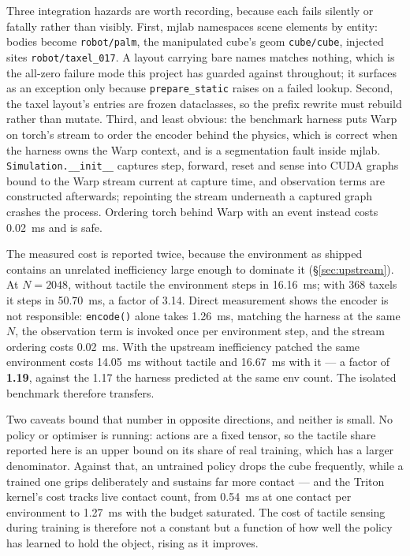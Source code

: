 \documentclass[journal]{IEEEtran}
\begin{document}
Three integration hazards are worth recording, because each fails silently or fatally rather than visibly. First, mjlab namespaces scene elements by entity: bodies become \texttt{robot/palm}, the manipulated cube's geom \texttt{cube/cube}, injected sites \texttt{robot/taxel\_017}. A layout carrying bare names matches nothing, which is the all-zero failure mode this project has guarded against throughout; it surfaces as an exception only because \texttt{prepare\_static} raises on a failed lookup. Second, the taxel layout's entries are frozen dataclasses, so the prefix rewrite must rebuild rather than mutate. Third, and least obvious: the benchmark harness puts Warp on torch's stream to order the encoder behind the physics, which is correct when the harness owns the Warp context, and is a segmentation fault inside mjlab. \texttt{Simulation.\_\_init\_\_} captures step, forward, reset and sense into CUDA graphs bound to the Warp stream current at capture time, and observation terms are constructed afterwards; repointing the stream underneath a captured graph crashes the process. Ordering torch behind Warp with an event instead costs 0.02~ms and is safe.

The measured cost is reported twice, because the environment as shipped contains an unrelated inefficiency large enough to dominate it (\S\ref{sec:upstream}). At $N=2048$, without tactile the environment steps in 16.16~ms; with 368 taxels it steps in 50.70~ms, a factor of 3.14. Direct measurement shows the encoder is not responsible: \texttt{encode()} alone takes 1.26~ms, matching the harness at the same $N$, the observation term is invoked once per environment step, and the stream ordering costs 0.02~ms. With the upstream inefficiency patched the same environment costs 14.05~ms without tactile and 16.67~ms with it --- a factor of \textbf{1.19}, against the 1.17 the harness predicted at the same env count. The isolated benchmark therefore transfers.

Two caveats bound that number in opposite directions, and neither is small. No policy or optimiser is running: actions are a fixed tensor, so the tactile share reported here is an upper bound on its share of real training, which has a larger denominator. Against that, an untrained policy drops the cube frequently, while a trained one grips deliberately and sustains far more contact --- and the Triton kernel's cost tracks live contact count, from 0.54~ms at one contact per environment to 1.27~ms with the budget saturated. The cost of tactile sensing during training is therefore not a constant but a function of how well the policy has learned to hold the object, rising as it improves.
\end{document}
